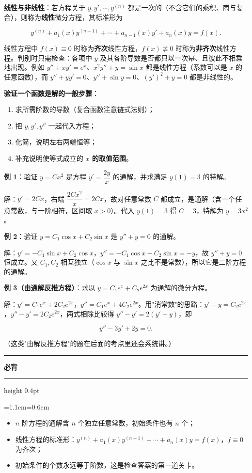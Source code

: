 \documentclass[11pt,openany,UTF8]{ctexbook}
\newcommand{\callouthead}[2]{%
  \par\addvspace{7pt}\noindent
  {\color{#1}\rule[-0.15em]{3pt}{1.05em}}\hspace{0.5em}%
  {\bfseries\color{#1}#2}\par\nobreak\vspace{-0.35em}%
  {\color{rulesep}\hrule height 0.4pt}\nobreak\vspace{0.45em}%
  \begingroup\small\setlength{\parindent}{0pt}%
  \leftskip=1.1em\rightskip=0.6em\noindent\ignorespaces}
\newcommand{\calloutend}{\par\endgroup\addvspace{7pt}}
\newenvironment{callkey}[1]{\callouthead{keybar}{#1}}{\calloutend}
\begin{document}
\textbf{线性与非线性}：若方程关于 $y,y',\cdots,y^{(n)}$ 都是一次的（不含它们的乘积、商与复合），则称为\textbf{线性}微分方程，其标准形为

\[y^{(n)}+a_1(x)y^{(n-1)}+\cdots+a_{n-1}(x)y'+a_n(x)y=f(x).\]

线性方程中 $f(x)\equiv 0$ 时称为\textbf{齐次}线性方程，$f(x)\not\equiv 0$ 时称为\textbf{非齐次}线性方程。判别时只需检查：各项中 $y$ 及其各阶导数是否都只以一次幂、且彼此不相乘地出现。例如 $y''+xy'=e^x$、$x^2y''+y=\sin x$ 都是线性方程（系数可以是 $x$ 的任意函数），而 $y''+yy'=0$、$y''+\sin y=0$、$(y')^2+y=0$ 都是非线性的。

\textbf{验证一个函数是解的一般步骤}：

\begin{enumerate}
\item 求所需阶数的导数（复合函数注意链式法则）；
\item 把 $y,y',y''$ 一起代入方程；
\item 化简，说明左右两端恒等；
\item 补充说明使等式成立的 \textbf{$x$ 的取值范围}。
\end{enumerate}
\textbf{例 1}：验证 $y=Cx^2$ 是方程 $y'=\dfrac{2y}{x}$ 的通解，并求满足 $y(1)=3$ 的特解。

解：$y'=2Cx$，右端 $\dfrac{2Cx^2}{x}=2Cx$，故对任意常数 $C$ 都成立，是通解（含一个任意常数，与一阶相符，区间取 $x>0$）。代入 $y(1)=3$ 得 $C=3$，特解为 $y=3x^2$。

\textbf{例 2}：验证 $y=C_1\cos x+C_2\sin x$ 是 $y''+y=0$ 的通解。

解：$y'=-C_1\sin x+C_2\cos x$，$y''=-C_1\cos x-C_2\sin x=-y$，故 $y''+y=0$ 恒成立。又 $C_1,C_2$ 相互独立（$\cos x$ 与 $\sin x$ 之比不是常数），所以它是二阶方程的通解。

\textbf{例 3（由通解反推方程）}：求以 $y=C_1e^{x}+C_2e^{2x}$ 为通解的微分方程。

解：$y'=C_1e^{x}+2C_2e^{2x}$，$y''=C_1e^{x}+4C_2e^{2x}$。用"消常数"的思路：$y'-y=C_2e^{2x}$，$y''-y'=2C_2e^{2x}$，两式相除比较得 $y''-y'=2(y'-y)$，即

\[y''-3y'+2y=0 .\]

（这类"由解反推方程"的题在后面的考点里还会系统讲。）

\begin{callkey}{必背}
\begin{itemize}
\item $n$ 阶方程的通解含 $n$ 个独立任意常数，初始条件也有 $n$ 个；
\item 线性方程的标准形：$y^{(n)}+a_1(x)y^{(n-1)}+\cdots+a_n(x)y=f(x)$，$f\equiv 0$ 为齐次；
\item 初始条件的个数永远等于阶数，这是检查答案的第一道关卡。
\end{itemize}
\end{callkey}
\end{document}
